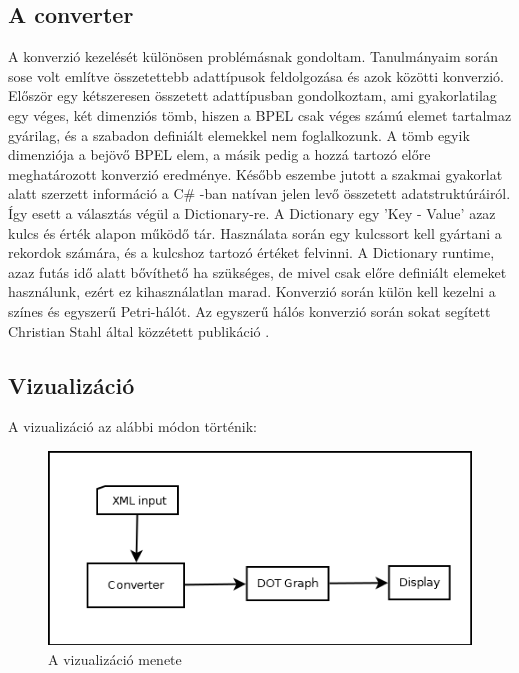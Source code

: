 \subsection{A converter }
A konverzió kezelését különösen problémásnak gondoltam. Tanulmányaim során sose volt említve összetettebb adattípusok feldolgozása és azok közötti konverzió. Először egy kétszeresen összetett adattípusban gondolkoztam, ami gyakorlatilag egy véges, két dimenziós tömb, hiszen a BPEL csak véges számú elemet tartalmaz gyárilag, és a szabadon definiált elemekkel nem foglalkozunk. A tömb egyik dimenziója a bejövő BPEL elem, a másik pedig a hozzá tartozó előre meghatározott konverzió eredménye. Később eszembe jutott a szakmai gyakorlat alatt szerzett információ a C\# -ban natívan jelen levő összetett adatstruktúráiról. Így esett a választás végül a Dictionary-re. A Dictionary egy 'Key - Value' azaz kulcs és érték alapon működő tár. Használata során egy kulcssort kell gyártani a rekordok számára, és a kulcshoz tartozó értéket felvinni. A Dictionary runtime, azaz futás idő alatt bővíthető ha szükséges, de mivel csak előre definiált elemeket használunk, ezért ez kihasználatlan marad. Konverzió során külön kell kezelni a színes és egyszerű Petri-hálót. Az egyszerű hálós konverzió során sokat segített Christian Stahl által közzétett publikáció \cite{bpelToPnet}.

\subsection{Vizualizáció}
A vizualizáció az alábbi módon történik:
\begin{figure}[h!]
\centering
\includegraphics[scale=0.6]{images/graphdisplay.png}
\caption{A vizualizáció menete}
\label{fig:graphdisplay}
\end{figure}

